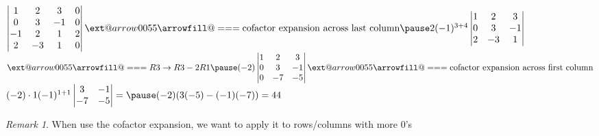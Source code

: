 \documentclass{beamer}
\makeatletter
\newcommand*{\Relbarfill@}{\arrowfill@\Relbar\Relbar\Relbar}
\newcommand*{\xequal}[2][]{\ext@arrow 0055\Relbarfill@{#1}{#2}}
\theoremstyle{definition}
\theoremstyle{remark}
\newtheorem*{remark}{Remark}
\makeatother
\begin{document}
\begin{frame}[t]
\begin{example}
$\left|\begin{matrix}
1&2&3&0\\
0&3&-1&0\\
-1&2&1&2\\
2&-3&1&0
\end{matrix}\right|\xequal{\text{cofactor expansion across last column}}\pause2(-1)^{3+4}\left|\begin{matrix}
1&2&3\\
0&3&-1\\
2&-3&1
\end{matrix}\right|$\\
$\xequal{R3\rightarrow R3-2R1}\pause(-2)\left|\begin{matrix}
1&2&3\\
0&3&-1\\
0&-7&-5
\end{matrix}\right|\xequal{\text{cofactor expansion across first column}}$\pause\\
$(-2)\cdot1(-1)^{1+1}\left|\begin{matrix}
3&-1\\
-7&-5
\end{matrix}\right|=\pause(-2)(3(-5)-(-1)(-7))=44$
\end{example}
\pause
\begin{remark}
When use the cofactor expansion, we want to apply it to rows/columns with more 0's
\end{remark}
\end{frame}
\end{document}
